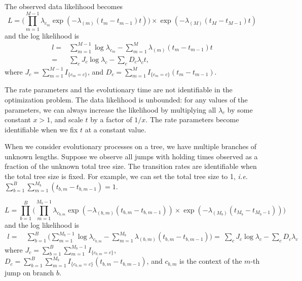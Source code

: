 \documentclass[11pt]{article}
\begin{document}
The observed data likelihood becomes
\begin{equation}
L = \Bigg(\prod\limits_{m=1}^{M-1} \lambda_{c_m}\exp(-\lambda_{(m)}(t_m - t_{m-1})t) \Bigg) \times \exp(-\lambda_{(M)}(t_M - t_{M-1})t) 
\end{equation}
and the log likelihood is 
\begin{equation}
\begin{aligned}
l = & \sum\limits_{m=1}^{M-1} \log\lambda_{c_m} - \sum\limits_{m=1}^{M} \lambda_{(m)}(t_m - t_{m-1})t \\
= & \sum_{c} J_c\log\lambda_c  - \sum_{c} D_c\lambda_c t, 
\end{aligned}
\end{equation}
where $J_c = \sum_{m=1}^{M-1}I_{\{c_m = c\}}$, and $D_c = \sum_{m=1}^{M}I_{\{c_m = c\}}(t_m - t_{m-1})$. 

The rate parameters and the evolutionary time are not identifiable in
the optimization problem. The data likelihood is unbounded: for any
values of the parameters, we can always increase the likelihood by
multiplying all $\lambda_c$ by some constant $x > 1$, and scale $t$ by
a factor of $1/x$. The rate parameters become identifiable when we fix
$t$ at a constant value.

When we consider evolutionary processes on a tree, we have multiple
branches of unknown lengths. Suppose we observe all jumps with holding
times observed as a fraction of the unknown total tree size. The
transition rates are identifiable when the total tree size is
fixed. For example, we can set the total tree size to 1, \textit{i.e.}
$\sum\limits_{b=1}^B\sum\limits_{m=1}^{M_b}(t_{b,m} - t_{b,m-1})
= 1$.
 
\begin{equation}
L = \prod\limits_{b=1}^B\Bigg(\prod\limits_{m=1}^{M_b-1} \lambda_{c_{b,m}}\exp(-\lambda_{(b,m)}(t_{b,m} - t_{b,m-1}))  \times \exp(-\lambda_{(M_b)}(t_{M_b} - t_{M_b-1})) \Bigg)
\end{equation}
and the log likelihood is 
\begin{equation}
  \begin{aligned}
    l = ~ & \sum\limits_{b=1}^B\Bigg( 
    \sum\limits_{m=1}^{M_b-1} \log\lambda_{c_{b,m}} 
    - \sum\limits_{m=1}^{M_b} \lambda_{(b,m)}(t_{b,m} - t_{b,m-1}) \Bigg)
    = ~ \sum_{c} J_c\log\lambda_c  - \sum_{c} D_{c}\lambda_c 
  \end{aligned}
\end{equation}
where $J_c = \sum\limits_{b=1}^B\sum\limits_{m=1}^{M_b-1}I_{\{c_{b,m}
= c\}}$, $D_{c} = \sum\limits_{b=1}^B\sum\limits_{m=1}^{M_b}I_{\{c_{b,m} =
c\}}(t_{b,m} - t_{b,m-1})$, and $c_{b,m}$ is the context of the $m$-th jump on branch $b$.
\end{document}
